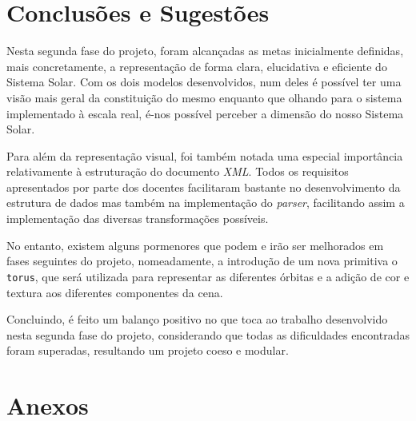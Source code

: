 \documentclass[a4paper]{article}
\begin{document}
\newpage
\section{Conclusões e Sugestões}

\hspace{3mm} Nesta segunda fase do projeto, foram alcançadas as metas inicialmente definidas, mais concretamente, a representação de forma clara, elucidativa e eficiente do Sistema Solar. Com os dois modelos desenvolvidos, num deles é possível ter uma visão mais geral da constituição do mesmo enquanto que olhando para o sistema implementado à escala real, é-nos possível perceber a dimensão do nosso Sistema Solar.

\par Para além da representação visual, foi também notada uma especial importância relativamente à estruturação do documento \emph{XML}. Todos os requisitos apresentados por parte dos docentes facilitaram bastante no desenvolvimento da estrutura de dados mas também na implementação do \emph{parser}, facilitando assim a implementação das diversas transformações possíveis.

No entanto, existem alguns pormenores que podem e irão ser melhorados em fases seguintes do projeto, nomeadamente, a introdução de um nova primitiva o \texttt{torus}, que será utilizada para representar as diferentes órbitas e a adição de cor e textura aos diferentes componentes da cena.

Concluindo, é feito um balanço positivo no que toca ao trabalho desenvolvido nesta segunda fase do projeto, considerando que todas as dificuldades encontradas foram superadas, resultando um projeto coeso e modular.

\newpage
\section{Anexos}
\end{document}
